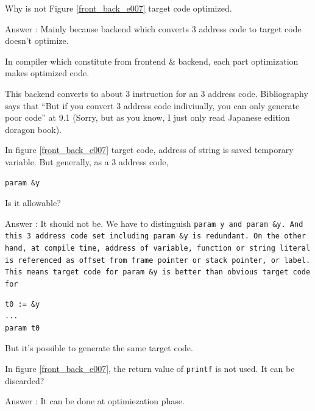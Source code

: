 \begin{QandA}
Why is not Figure \ref{front_back_e007} target code optimized.

Answer : Mainly because backend which converts 3 address code to target code
doesn't optimize.

In compiler which constitute from frontend \& backend, each part
optimization makes optimized code.

This backend converts to about 3 instruction for an 3 address code.
Bibliography \cite{doragon} says that ``But if you convert 3 address code
 indiviually, you can only generate poor code'' at 9.1
(Sorry, but as you know, I just only read Japanese edition doragon book).
\end{QandA}

\begin{QandA}
\label{front_back_e003}
In figure \ref{front_back_e007} target code, address of string is saved
temporary variable. But generally, as a 3 address code,
\begin{verbatim}
param &y
\end{verbatim}
Is it allowable?

Answer : It should not be. We have to distinguish \tt{param y} and
\tt{param \&y}. And this 3 address code set including \tt{param \&y} is
redundant. On the other hand, at compile time, address of
variable, function or string literal is referenced as offset from
frame pointer or stack pointer, or label. This means target code
for \tt{param \&y} is better than obvious target code for
\begin{verbatim}
t0 := &y
...
param t0
\end{verbatim}
But it's possible to generate the same target code.
\end{QandA}

\begin{QandA}
In figure \ref{front_back_e007}, the return value of {\tt{printf}} 
is not used. It can be discarded?

Answer : It can be done at optimiezation phase.
\end{QandA}

